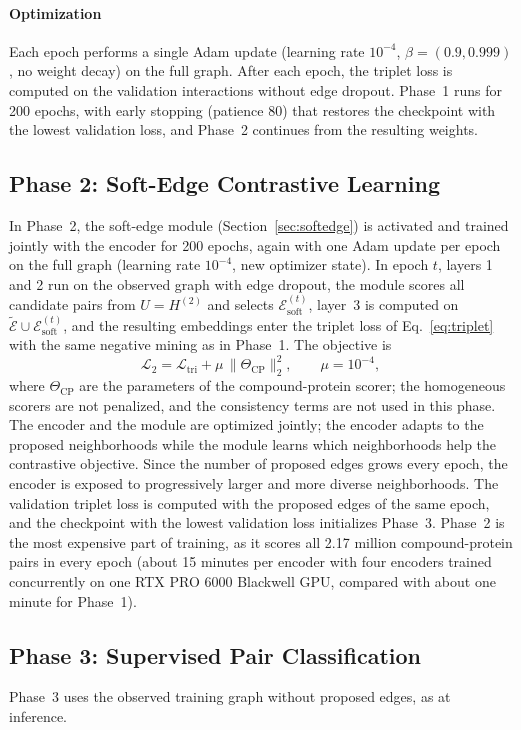 \documentclass[11pt,letterpaper]{article}
\begin{document}
\paragraph{Optimization}
Each epoch performs a single Adam update (learning rate $10^{-4}$, $\beta=(0.9,0.999)$, no weight decay) on the full graph. After each epoch, the triplet loss is computed on the validation interactions without edge dropout. Phase~1 runs for 200 epochs, with early stopping (patience 80) that restores the checkpoint with the lowest validation loss, and Phase~2 continues from the resulting weights.

\subsection{Phase 2: Soft-Edge Contrastive Learning}
In Phase~2, the soft-edge module (Section~\ref{sec:softedge}) is activated and trained jointly with the encoder for 200 epochs, again with one Adam update per epoch on the full graph (learning rate $10^{-4}$, new optimizer state). In epoch $t$, layers 1 and 2 run on the observed graph with edge dropout, the module scores all candidate pairs from $U=H^{(2)}$ and selects $\mathcal{E}^{(t)}_{\text{soft}}$, layer~3 is computed on $\tilde{\mathcal{E}}\cup\mathcal{E}^{(t)}_{\text{soft}}$, and the resulting embeddings enter the triplet loss of Eq.~\eqref{eq:triplet} with the same negative mining as in Phase~1. The objective is
\[
\mathcal{L}_2 = \mathcal{L}_{\text{tri}} + \mu\,\|\Theta_{\text{CP}}\|_2^2,\qquad \mu=10^{-4},
\]
where $\Theta_{\text{CP}}$ are the parameters of the compound-protein scorer; the homogeneous scorers are not penalized, and the consistency terms are not used in this phase. The encoder and the module are optimized jointly; the encoder adapts to the proposed neighborhoods while the module learns which neighborhoods help the contrastive objective. Since the number of proposed edges grows every epoch, the encoder is exposed to progressively larger and more diverse neighborhoods. The validation triplet loss is computed with the proposed edges of the same epoch, and the checkpoint with the lowest validation loss initializes Phase~3. Phase~2 is the most expensive part of training, as it scores all 2.17 million compound-protein pairs in every epoch (about 15 minutes per encoder with four encoders trained concurrently on one RTX PRO 6000 Blackwell GPU, compared with about one minute for Phase~1).

\subsection{Phase 3: Supervised Pair Classification}
Phase~3 uses the observed training graph without proposed edges, as at inference.
\end{document}
